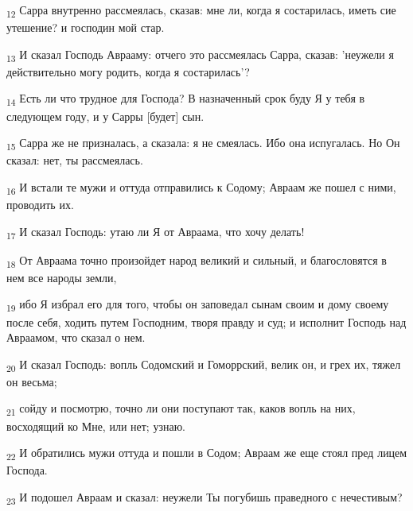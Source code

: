 \begin{tcolorbox}
\textsubscript{12} Сарра внутренно рассмеялась, сказав: мне ли, когда я состарилась, иметь сие утешение? и господин мой стар.
\end{tcolorbox}
\begin{tcolorbox}
\textsubscript{13} И сказал Господь Аврааму: отчего это рассмеялась Сарра, сказав: 'неужели я действительно могу родить, когда я состарилась'?
\end{tcolorbox}
\begin{tcolorbox}
\textsubscript{14} Есть ли что трудное для Господа? В назначенный срок буду Я у тебя в следующем году, и у Сарры [будет] сын.
\end{tcolorbox}
\begin{tcolorbox}
\textsubscript{15} Сарра же не призналась, а сказала: я не смеялась. Ибо она испугалась. Но Он сказал: нет, ты рассмеялась.
\end{tcolorbox}
\begin{tcolorbox}
\textsubscript{16} И встали те мужи и оттуда отправились к Содому; Авраам же пошел с ними, проводить их.
\end{tcolorbox}
\begin{tcolorbox}
\textsubscript{17} И сказал Господь: утаю ли Я от Авраама, что хочу делать!
\end{tcolorbox}
\begin{tcolorbox}
\textsubscript{18} От Авраама точно произойдет народ великий и сильный, и благословятся в нем все народы земли,
\end{tcolorbox}
\begin{tcolorbox}
\textsubscript{19} ибо Я избрал его для того, чтобы он заповедал сынам своим и дому своему после себя, ходить путем Господним, творя правду и суд; и исполнит Господь над Авраамом, что сказал о нем.
\end{tcolorbox}
\begin{tcolorbox}
\textsubscript{20} И сказал Господь: вопль Содомский и Гоморрский, велик он, и грех их, тяжел он весьма;
\end{tcolorbox}
\begin{tcolorbox}
\textsubscript{21} сойду и посмотрю, точно ли они поступают так, каков вопль на них, восходящий ко Мне, или нет; узнаю.
\end{tcolorbox}
\begin{tcolorbox}
\textsubscript{22} И обратились мужи оттуда и пошли в Содом; Авраам же еще стоял пред лицем Господа.
\end{tcolorbox}
\begin{tcolorbox}
\textsubscript{23} И подошел Авраам и сказал: неужели Ты погубишь праведного с нечестивым?
\end{tcolorbox}
